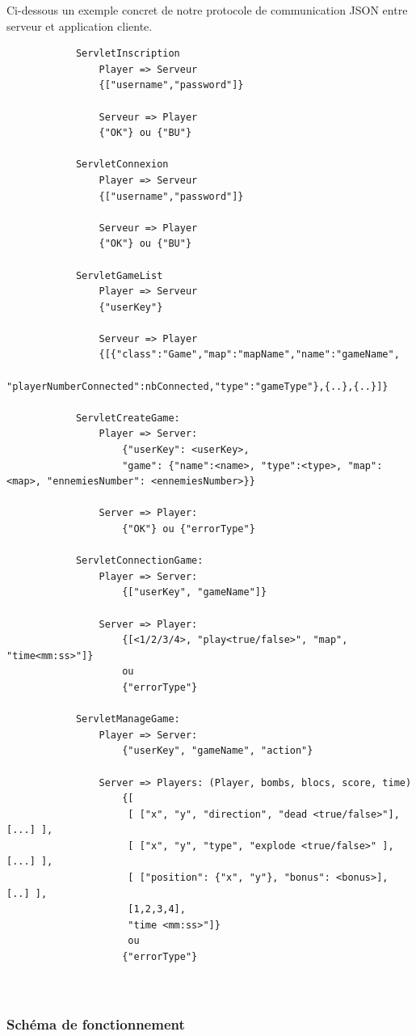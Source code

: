 		Ci-dessous un exemple concret de notre protocole de communication JSON entre
		serveur et application cliente.
		
			
		\begin{verbatim}
			ServletInscription
				Player => Serveur
				{["username","password"]}
				
				Serveur => Player
				{"OK"} ou {"BU"}
				
			ServletConnexion 	
				Player => Serveur
				{["username","password"]}
				
				Serveur => Player
				{"OK"} ou {"BU"}
				
			ServletGameList
				Player => Serveur
				{"userKey"}
			
				Serveur => Player
				{[{"class":"Game","map":"mapName","name":"gameName",
				 "playerNumberConnected":nbConnected,"type":"gameType"},{..},{..}]}
				 
			ServletCreateGame:
				Player => Server:
					{"userKey": <userKey>, 
					"game": {"name":<name>, "type":<type>, "map":<map>, "ennemiesNumber": <ennemiesNumber>}}
					
				Server => Player:
					{"OK"} ou {"errorType"}
				 
			ServletConnectionGame:
				Player => Server:
					{["userKey", "gameName"]}
					
				Server => Player:
					{[<1/2/3/4>, "play<true/false>", "map", "time<mm:ss>"]} 
					ou 
					{"errorType"}
					
			ServletManageGame:
				Player => Server: 
					{"userKey", "gameName", "action"}	
					
				Server => Players: (Player, bombs, blocs, score, time)
					{[
					 [ ["x", "y", "direction", "dead <true/false>"],[...] ],
					 [ ["x", "y", "type", "explode <true/false>" ], [...] ],
					 [ ["position": {"x", "y"}, "bonus": <bonus>], [..] ],
					 [1,2,3,4],
					 "time <mm:ss>"]} 
					 ou 
					{"errorType"}
				 
				 
		\end{verbatim}
			
		
	

	\subsubsection{Schéma de fonctionnement }
		
